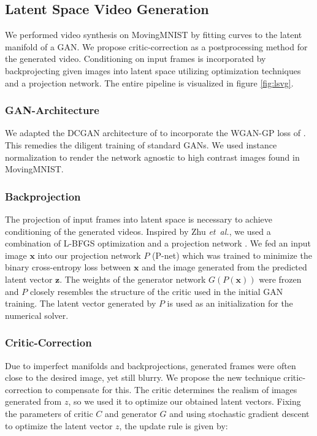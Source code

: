 \documentclass[10pt,twocolumn,letterpaper]{article}
\begin{document}
\subsection{Latent Space Video Generation}

We performed video synthesis on MovingMNIST by fitting curves to the latent manifold of a GAN. We propose critic-correction as a postprocessing method for the generated video. Conditioning on input frames is incorporated by backprojecting given images into latent space utilizing optimization techniques and a projection network. The entire pipeline is visualized in figure \ref{fig:lsvg}.

\subsubsection{GAN-Architecture} 
We adapted the DCGAN architecture of \cite{DCGAN} to incorporate the WGAN-GP loss of \cite{Gulrajani2017}. This remedies the diligent training of standard GANs. We used instance normalization \cite{INST} to render the network agnostic to high contrast images found in MovingMNIST. 

\subsubsection{Backprojection}
The projection of input frames into latent space is necessary to achieve conditioning of the generated videos. Inspired by Zhu {\em et\ al.}, we used a combination of L-BFGS optimization and a projection network \cite{Zhu2016}. We fed an input image $\mathbf{x}$ into our projection network $P$ (P-net) which was trained to minimize the binary cross-entropy loss between $\mathbf{x}$ and the image generated from the predicted latent vector $\mathbf{z}$. The weights of the generator network $G(P(\mathbf{x}))$ were frozen and $P$ closely resembles the structure of the critic used in the initial GAN training. The latent vector generated by $P$ is used as an initialization for the numerical solver. 

\subsubsection{Critic-Correction}
Due to imperfect manifolds and backprojections, generated frames were often close to the desired image, yet still blurry. We propose the new technique critic-correction to compensate for this. The critic determines the realism of images generated from $z$, so we used it to optimize our obtained latent vectors. Fixing the parameters of critic $C$ and generator $G$ and using stochastic gradient descent to optimize the latent vector $z$, the update rule is given by:
\end{document}
